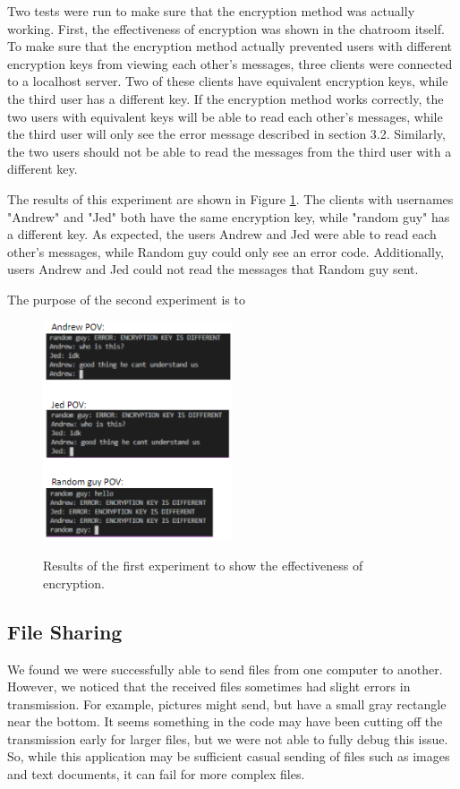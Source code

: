 \documentclass{article}
\begin{document}
Two tests were run to make sure that the encryption method was actually working. First, the effectiveness of encryption was shown in the chatroom itself. To make sure that the encryption method actually prevented users with different encryption keys from viewing each other's messages, three clients were connected to a localhost server. Two of these clients have equivalent encryption keys, while the third user has a different key. If the encryption method works correctly, the two users with equivalent keys will be able to read each other's messages, while the third user will only see the error message described in section 3.2. Similarly, the two users should not be able to read the messages from the third user with a different key. 

The results of this experiment are shown in Figure \ref{Encryption Results Figure}. The clients with usernames "Andrew" and "Jed" both have the same encryption key, while "random guy" has a different key. As expected, the users Andrew and Jed were able to read each other's messages, while Random guy could only see an error code. Additionally, users Andrew and Jed could not read the messages that Random guy sent. 

The purpose of the second experiment is to 

\begin{figure}[h]
\centering
\caption{Results of the first experiment to show the effectiveness of encryption.}
\includegraphics[width=0.5\textwidth]{media/EncryptionExperiment.PNG}
\label{Encryption Results Figure}

\end{figure}

\subsection{File Sharing}
We found we were successfully able to send files from one computer to another. However, we noticed that the received files sometimes had slight errors in transmission. For example, pictures might send, but have a small gray rectangle near the bottom. It seems something in the code may have been cutting off the transmission early for larger files, but we were not able to fully debug this issue. So, while this application may be sufficient casual sending of files such as images and text documents, it can fail for more complex files.
\end{document}
